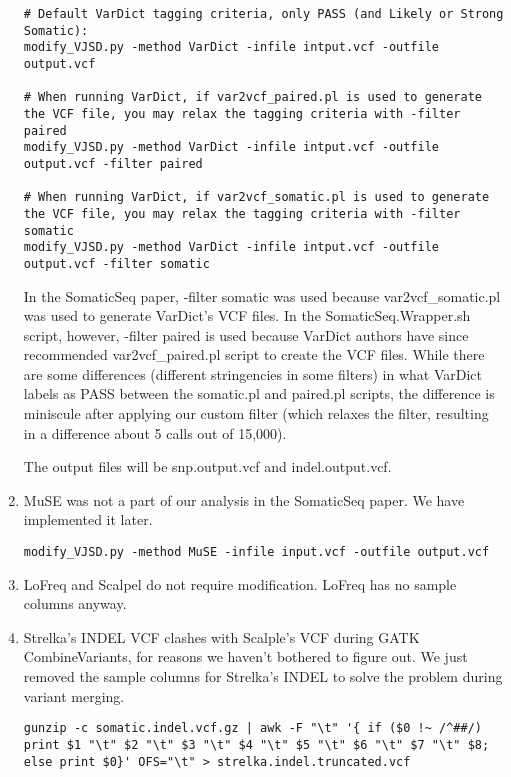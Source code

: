 \documentclass[10pt,letterpaper]{article}
\begin{document}
\begin{sloppypar}
\begin{enumerate}
\begin{lstlisting}
# Default VarDict tagging criteria, only PASS (and Likely or Strong Somatic):
modify_VJSD.py -method VarDict -infile intput.vcf -outfile output.vcf
	
# When running VarDict, if var2vcf_paired.pl is used to generate the VCF file, you may relax the tagging criteria with -filter paired
modify_VJSD.py -method VarDict -infile intput.vcf -outfile output.vcf -filter paired
	
# When running VarDict, if var2vcf_somatic.pl is used to generate the VCF file, you may relax the tagging criteria with -filter somatic
modify_VJSD.py -method VarDict -infile intput.vcf -outfile output.vcf -filter somatic
\end{lstlisting}
	

In the SomaticSeq paper, -filter somatic was used because var2vcf\_somatic.pl was used to generate VarDict's VCF files. In the SomaticSeq.Wrapper.sh script, however, -filter paired is used because VarDict authors have since recommended var2vcf\_paired.pl script to create the VCF files. While there are some differences (different stringencies in some filters) in what VarDict labels as PASS between the somatic.pl and paired.pl scripts, the difference is miniscule after applying our custom filter (which relaxes the filter, resulting in a difference about 5 calls out of 15,000). 

The output files will be snp.output.vcf and indel.output.vcf. 


\item
MuSE was not a part of our analysis in the SomaticSeq paper. We have implemented it later. 
	
\begin{lstlisting}
modify_VJSD.py -method MuSE -infile input.vcf -outfile output.vcf
\end{lstlisting}


\item
LoFreq and Scalpel do not require modification. LoFreq has no sample columns anyway. 


\item
Strelka's INDEL VCF clashes with Scalple's VCF during GATK CombineVariants, for reasons we haven't bothered to figure out. We just removed the sample columns for Strelka's INDEL to solve the problem during variant merging. 
\begin{lstlisting}
gunzip -c somatic.indel.vcf.gz | awk -F "\t" '{ if ($0 !~ /^##/) print $1 "\t" $2 "\t" $3 "\t" $4 "\t" $5 "\t" $6 "\t" $7 "\t" $8; else print $0}' OFS="\t" > strelka.indel.truncated.vcf
\end{lstlisting}



\end{enumerate}
\end{sloppypar}
\end{document}
